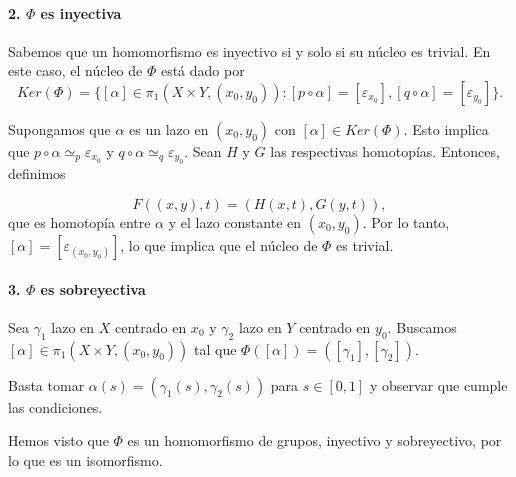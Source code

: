 {    \paragraph{2. $\Phi$ es inyectiva}
    Sabemos que un homomorfismo es inyectivo si y solo si su núcleo es trivial. En este caso, el núcleo de $\Phi$ está dado por
    \[
        Ker(\Phi) = \{[\alpha] \in \pi_1(X \times Y, (x_0, y_0)) : [p \circ \alpha] = [\varepsilon_{x_0}], [q \circ \alpha] = [\varepsilon_{y_0}]\}.  
    \]

    Supongamos que $\alpha$ es un lazo en $(x_0, y_0)$ con $[\alpha] \in Ker(\Phi)$. Esto implica que $p \circ \alpha \simeq_p \varepsilon_{x_0}$ y $q \circ \alpha \simeq_q \varepsilon_{y_0}$. Sean $H$ y $G$ las respectivas homotopías. Entonces, definimos

    \[
        F((x, y), t) = (H(x, t), G(y, t)),
    \]
    que es homotopía entre $\alpha$ y el lazo constante en $(x_0, y_0)$. Por lo tanto, $[\alpha] = [\varepsilon_{(x_0, y_0)}]$, lo que implica que el núcleo de $\Phi$ es trivial.
    \paragraph{3. $\Phi$ es sobreyectiva}
    Sea $\gamma_1$ lazo en $X$ centrado en $x_0$ y $\gamma_2$ lazo en $Y$ centrado en $y_0$. Buscamos $[\alpha] \in \pi_1(X \times Y, (x_0, y_0))$ tal que $\Phi([\alpha]) = ([\gamma_1], [\gamma_2])$. 

    Basta tomar $\alpha(s) = (\gamma_1(s), \gamma_2(s))$ para $s \in [0, 1]$ y observar que cumple las condiciones. 

    \vspace{0.5cm}
    Hemos visto que $\Phi$ es un homomorfismo de grupos, inyectivo y sobreyectivo, por lo que es un isomorfismo. 
}   





